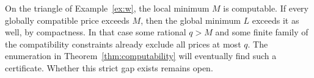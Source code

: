 \documentclass[11pt,letterpaper]{article}
\theoremstyle{definition}
\begin{document}
On the triangle of Example~\ref{ex:w}, the local minimum \(M\) is
computable. If every globally compatible price exceeds \(M\), then the
global minimum \(L\) exceeds it as well, by compactness. In that case
some rational \(q>M\) and some finite family of the compatibility
constraints already exclude all prices at most \(q\). The enumeration
in Theorem~\ref{thm:computability} will eventually find such a certificate.
Whether this strict gap exists remains open.



\end{document}

